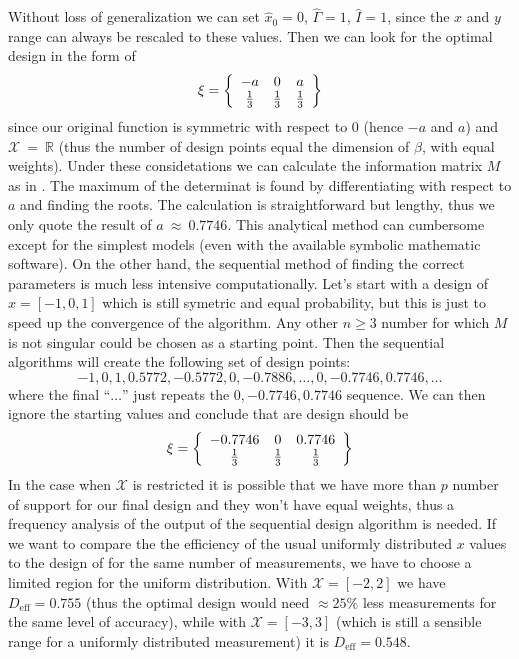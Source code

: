 \documentclass[12pt]{iopart}
\begin{document}
Without loss of generalization we can set $\hat x_0 = 0$, $\hat \Gamma = 1$, $\hat I = 1$, since the $x$ and $y$ range can always be rescaled to these values. Then we can look for the optimal design in the form of 
\begin{equation}
\xi = \left\{ 
  \begin{array}{c c c}
    -a & 0 & a\\
    \frac{1}{3} & \frac{1}{3} & \frac{1}{3}\\
  \end{array} \right \}
\end{equation}
since our original function is symmetric with respect to 0 (hence $-a$ and $a$) and $\mathcal{X}~=~\mathbb{R}$ (thus the number of design points equal the dimension of $\beta$, with equal weights). Under these considetations we can calculate the information matrix $M$ as in . The maximum of the determinat is found by differentiating with respect to $a$ and finding the roots. The calculation is straightforward but lengthy, thus we only quote the result of $a~\approx~0.7746$. This analytical method can cumbersome except for the simplest models (even with the available symbolic mathematic software). On the other hand, the sequential method of finding the correct parameters is much less intensive computationally. Let's start with a design of $x = [-1, 0, 1]$ which is still symetric and equal probability, but this is just to speed up the convergence of the algorithm. Any other $n \geq 3$ number for which $M$ is not singular could be chosen as a starting point. Then the sequential algorithms will create the following set of design points:
\begin{equation}
    -1, 0, 1, 0.5772, -0.5772, 0, -0.7886,\ldots,0,-0.7746,0.7746,\ldots
\end{equation}
where the final ``$\ldots$'' just repeats the $0,-0.7746,0.7746$ sequence. We can then ignore the starting values and conclude that are design should be
\begin{equation}
\xi = \left\{ 
  \begin{array}{c c c}
    -0.7746 & 0 & 0.7746\\
    \frac{1}{3} & \frac{1}{3} & \frac{1}{3}\\
  \end{array} \right \}
\label{eq:lorentzxi1}
\end{equation}
In the case when $\mathcal{X}$ is restricted it is possible that we have more than $p$ number of support for our final design and they won't have equal weights, thus a frequency analysis of the output of the sequential design algorithm is needed.
If we want to compare the the efficiency of the usual uniformly distributed $x$ values to the design of  for the same number of measurements, we have to choose a limited region for the uniform distribution. With $\mathcal{X} = [-2, 2]$ we have $D_\mathrm{eff} = 0.755$ (thus the optimal design would need $\approx 25\%$ less measurements for the same level of accuracy), while with $\mathcal{X} =[-3, 3]$ (which is still a sensible range for a uniformly distributed measurement) it is $D_\mathrm{eff} = 0.548$.
\end{document}

